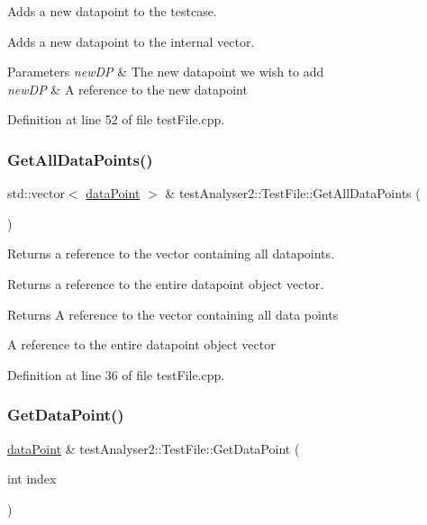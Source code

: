 Adds a new datapoint to the testcase. 

Adds a new datapoint to the internal vector.


\begin{DoxyParams}{Parameters}
{\em new\+DP} & The new datapoint we wish to add\\
\hline
{\em new\+DP} & A reference to the new datapoint \\
\hline
\end{DoxyParams}


Definition at line 52 of file test\+File.\+cpp.

\mbox{\label{classtestAnalyser2_1_1TestFile_a547b149d49429a2124245c7e2dccf6e7}} 
\subsubsection{\texorpdfstring{GetAllDataPoints()}{GetAllDataPoints()}}
{\footnotesize\ttfamily std\+::vector$<$ \mbox{\hyperlink{structtestAnalyser2_1_1dataPoint}{data\+Point}} $>$ \& test\+Analyser2\+::\+Test\+File\+::\+Get\+All\+Data\+Points (\begin{DoxyParamCaption}{ }\end{DoxyParamCaption})}



Returns a reference to the vector containing all datapoints. 

Returns a reference to the entire datapoint object vector.

\begin{DoxyReturn}{Returns}
A reference to the vector containing all data points

A reference to the entire datapoint object vector 
\end{DoxyReturn}


Definition at line 36 of file test\+File.\+cpp.

\mbox{\label{classtestAnalyser2_1_1TestFile_a36b227c43962158aa86e17cf888fe515}} 
\subsubsection{\texorpdfstring{GetDataPoint()}{GetDataPoint()}}
{\footnotesize\ttfamily \mbox{\hyperlink{structtestAnalyser2_1_1dataPoint}{data\+Point}} \& test\+Analyser2\+::\+Test\+File\+::\+Get\+Data\+Point (\begin{DoxyParamCaption}\item[{int}]{index }\end{DoxyParamCaption})}




